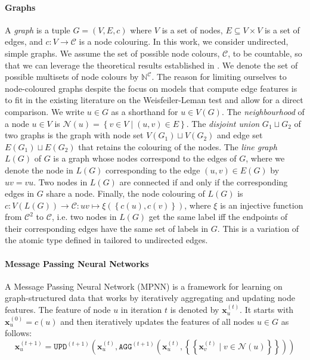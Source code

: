 \documentclass{article}
\newcommand{\set}[1]{\left\{#1\right\}}
\newcommand{\multiset}[1]{\left\{\!\!\left\{#1\right\}\!\!\right\}}
\newcommand{\iter}[1]{^{(#1)}}
\newcommand{\upd}{\texttt{UPD}}
\newcommand{\agg}{\texttt{AGG}}
\newcommand{\initdec}{\xi}
\newcommand{\nbh}{\mathcal{N}}
\newcommand{\bs}[1]{\boldsymbol{#1}}
\newcommand{\feat}{\bs{x}}
\newcommand{\mcc}{\mathcal{C}}
\newcommand{\mbn}{\mathbb{N}}
\begin{document}
\paragraph{Graphs}
A \emph{graph} is a tuple $G=(V,E,c)$ where $V$ is a set of nodes, $E\subseteq V\times V$ is a set of edges, and $c: V\rightarrow\mcc$ is a node colouring. In this work, we consider undirected, simple graphs.
We assume the set of possible node colours, $\mcc$, to be countable, so that we can leverage the theoretical results established in \cite{xu2018powerful}. We denote the set of possible multisets of node colours by $\mbn^\mcc$.
The reason for limiting ourselves to node-coloured graphs despite the focus on models that compute edge features is to fit in the existing literature on the Weisfeiler-Leman test and allow for a direct comparison. We write $u\in G$ as a shorthand for $u\in V(G)$.
The \emph{neighbourhood} of a node $u\in V$ is $\nbh(u) = \set{v\in V \mid (u,v)\in E}$. The \emph{disjoint union} $G_1 \sqcup G_2$ of two graphs is the graph with node set $V(G_1) \sqcup V(G_2)$ and edge set $E(G_1) \sqcup E(G_2)$ that retains the colouring of the nodes.
The \emph{line graph} $L(G)$ of $G$ is a graph whose nodes correspond to the edges of $G$, where we denote the node in $L(G)$ corresponding to the edge $(u,v)\in E(G)$ by $uv=vu$. Two nodes in $L(G)$ are connected if and only if the corresponding edges in $G$ share a node. Finally, the node colouring of $L(G)$ is $c: V(L(G)) \rightarrow \mcc: uv \mapsto \initdec(\set{c(u),c(v)})$, where $\initdec$ is an injective function from $\mcc^2$ to $\mcc$, i.e. two nodes in $L(G)$ get the same label iff the endpoints of their corresponding edges have the same set of labels in $G$. This is a variation of the atomic type defined in \cite{morris2019weisfeiler} tailored to undirected edges.

\paragraph{Message Passing Neural Networks}
A Message Passing Neural Network (MPNN) \cite{gilmer2017neural} is a framework for learning on graph-structured data that works by iteratively aggregating and updating node features. The feature of node $u$ in iteration $t$ is denoted by $\feat_u\iter{t}$. It starts with $\feat_u\iter{0} = c(u)$ and then iteratively updates the features of all nodes $u\in G$ as follows:
\begin{equation}
    \feat_u\iter{t+1}
    = \upd\iter{t+1}\left(\feat_u\iter{t},
    \agg\iter{t+1}\left(\feat_u\iter{t}, \multiset{\feat_v\iter{t} \mid v\in \nbh(u)}\right)\right)
\end{equation}
\end{document}
